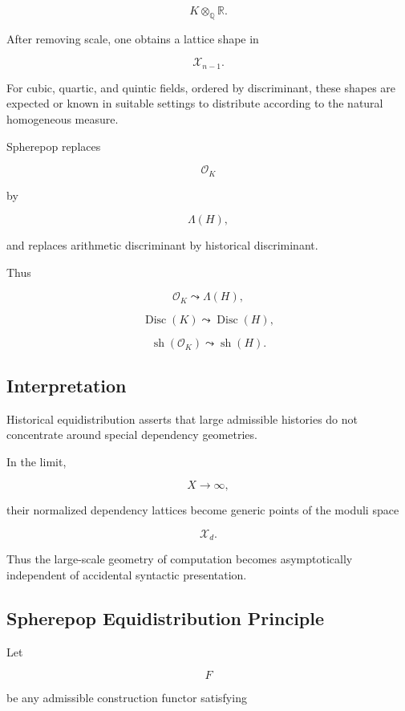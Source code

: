 \documentclass[12pt,oneside]{article}
\theoremstyle{definition}
\theoremstyle{remark}
\begin{document}
\[
K\otimes_{\mathbb Q}\mathbb R.
\]

After removing scale, one obtains a lattice shape in

\[
\mathcal X_{n-1}.
\]

For cubic, quartic, and quintic fields, ordered by discriminant, these shapes
are expected or known in suitable settings to distribute according to the
natural homogeneous measure.

Spherepop replaces

\[
\mathcal O_K
\]

by

\[
\Lambda(H),
\]

and replaces arithmetic discriminant by historical discriminant.

Thus

\[
\mathcal O_K
\leadsto
\Lambda(H),
\]

\[
\operatorname{Disc}(K)
\leadsto
\operatorname{Disc}(H),
\]

\[
\operatorname{sh}(\mathcal O_K)
\leadsto
\operatorname{sh}(H).
\]

\subsection*{Interpretation}

Historical equidistribution asserts that large admissible histories do not
concentrate around special dependency geometries.

In the limit,

\[
X\rightarrow\infty,
\]

their normalized dependency lattices become generic points of the moduli space

\[
\mathcal X_d.
\]

Thus the large-scale geometry of computation becomes asymptotically
independent of accidental syntactic presentation.

\subsection*{Spherepop Equidistribution Principle}

Let

\[
F
\]

be any admissible construction functor satisfying
\end{document}
